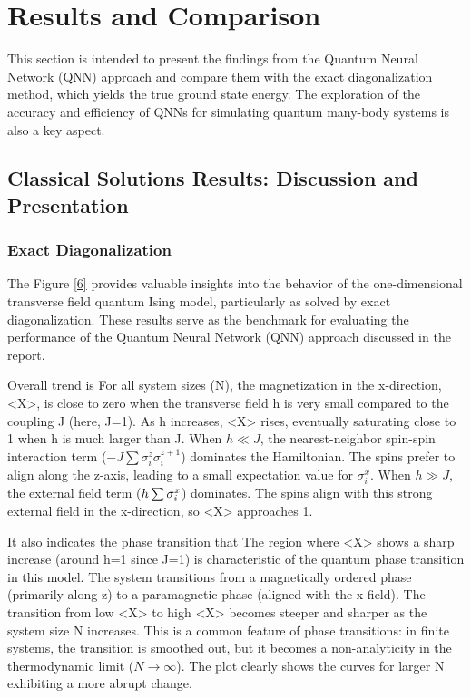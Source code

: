 \documentclass[pre,twocolumn,floatfix]{revtex4-1}
\begin{document}
\section{Results and Comparison}
This section is intended to present the findings from the Quantum Neural Network (QNN) approach and compare them with the exact diagonalization method, which yields the true ground state energy. The exploration of the accuracy and efficiency of QNNs for simulating quantum many-body systems is also a key aspect.

\subsection{Classical Solutions Results: Discussion and Presentation}
\subsubsection{Exact Diagonalization}
The Figure \ref{6} provides valuable insights into the behavior of the one-dimensional transverse field quantum Ising model, particularly as solved by exact diagonalization. These results serve as the benchmark for evaluating the performance of the Quantum Neural Network (QNN) approach discussed in the report.

Overall trend is For all system sizes (N), the magnetization in the x-direction, <X>, is close to zero when the transverse field h is very small compared to the coupling J (here, J=1). As h increases, <X> rises, eventually saturating close to 1 when h is much larger than J. When $h \ll J$, the nearest-neighbor spin-spin interaction term ($-J\sum\sigma_i^z\sigma_i^{z+1}$) dominates the Hamiltonian. The spins prefer to align along the z-axis, leading to a small expectation value for $\sigma_i^x$. When $h\gg J$, the external field term ($\-h\sum\sigma_i^x$) dominates. The spins align with this strong external field in the x-direction, so <X> approaches 1.

It also indicates the phase transition that The region where <X> shows a sharp increase (around h=1 since J=1) is characteristic of the quantum phase transition in this model. The system transitions from a magnetically ordered phase (primarily along z) to a paramagnetic phase (aligned with the x-field). The transition from low <X> to high <X> becomes steeper and sharper as the system size N increases. This is a common feature of phase transitions: in finite systems, the transition is smoothed out, but it becomes a non-analyticity in the thermodynamic limit ($N \to \infty$). The plot clearly shows the curves for larger N exhibiting a more abrupt change.
\end{document}
